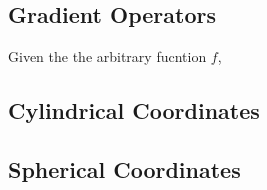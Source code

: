 \documentclass[a4paper, 12pt]{report}
\begin{document}
\begin{center}
\chapter{Gradient Operators}
\begin{comment}
\end{comment}
Given the the arbitrary fucntion $f$,
\begin{comment}
\end{comment}
\section{Cylindrical Coordinates}
\begin{comment}
\end{comment}
\section{Spherical Coordinates}
\begin{comment}
\end{comment}
\end{center}
\end{document}
